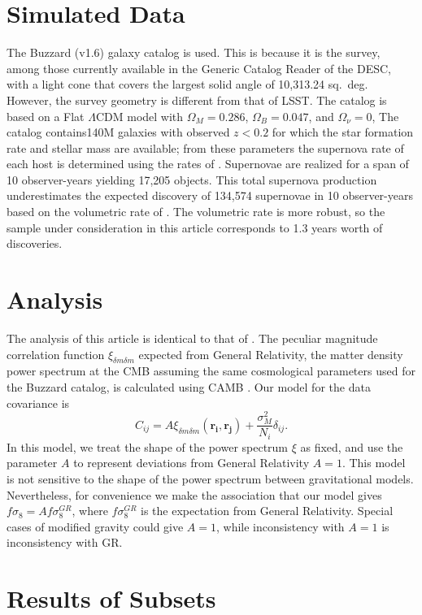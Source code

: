 \documentclass{aastex62}   	%
\begin{document}
\section{Simulated Data}
The Buzzard (v1.6) galaxy catalog is used.  This is because it is the survey, among those currently available
in the Generic Catalog Reader of the DESC, with a light cone that covers the largest solid angle of 10,313.24 sq.~deg.  However,
the survey geometry is different
from that of LSST.  The catalog is based on a Flat $\Lambda$CDM model with $\Omega_M=0.286$, $\Omega_B=0.047$, and
$\Omega_\nu=0$,
The catalog contains140M galaxies with observed $z<0.2$ for which the star formation rate and stellar mass are available; from these  parameters the
supernova rate of each host is determined using the rates of
\citet{2012ApJ...755...61S}.  Supernovae are realized for a span of 10 observer-years yielding 17,205 objects.  This total supernova
production underestimates the expected discovery of 134,574 supernovae in 10 observer-years based on the volumetric
rate of \citet{2010ApJ...713.1026D}.  The volumetric rate is more robust, so the sample under consideration in this article
corresponds to 1.3 years worth of discoveries.

\section{Analysis}
The analysis of this article is identical to that of \citet{2015JCAP...12..033H, 2017JCAP...05..015H}.   The peculiar magnitude correlation
function $\xi_{\delta m \delta m}$ expected from General Relativity, the matter density power spectrum at the CMB assuming the same
cosmological parameters used for the Buzzard catalog, is calculated using CAMB \citep{Lewis:2002ah}.  Our model for the data covariance
is
\begin{equation}
C_{ij} = A\xi_{\delta m \delta m}(\mathbf{r_i},\mathbf{r_j}) + \frac{\sigma_M^2}{N_i} \delta_{ij}.
\end{equation}
In this model, we treat the shape of the power spectrum $\xi$ as fixed, and use the parameter $A$ to represent
deviations from General Relativity $A=1$.  This model is not sensitive to  the shape of
the power spectrum between gravitational models.  Nevertheless, for
convenience we make the association that our model gives $f\sigma_8 = A f\sigma_8^{GR}$, where $ f\sigma_8^{GR}$ is the expectation
from General Relativity.  Special cases of modified gravity could give $A=1$, while inconsistency with $A=1$ is inconsistency with GR.

\section{Results of Subsets}



\end{document}
